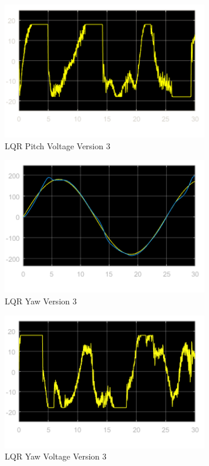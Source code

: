 \documentclass[fontsize=11pt, %
                             paper=letter, %
                             openany, %
                             captions=tableheading,
                             index=totoc,
                             hyperref]{labbook}
\begin{document}
\begin{addmargin}[0cm]{0cm}
\begin{figure}[H]
  \centering
  \includegraphics[width=0.8\textwidth]{figs/img/02212019/LQR_PitchVoltV3.png}
  \caption{LQR Pitch Voltage Version 3}
  \label{fig:LQR_PitchVoltV3}
\end{figure}

\begin{figure}[H]
  \centering
  \includegraphics[width=0.8\textwidth]{figs/img/02212019/LQR_YawV3.png}
  \caption{LQR Yaw Version 3}
  \label{fig:LQR_YawV3}
\end{figure}

\begin{figure}[H]
  \centering
  \includegraphics[width=0.8\textwidth]{figs/img/02212019/LQR_YawVoltV3.png}
  \caption{LQR Yaw Voltage Version 3}
  \label{fig:LQR_YawVoltV3}
\end{figure}


\end{addmargin}
\end{document}
